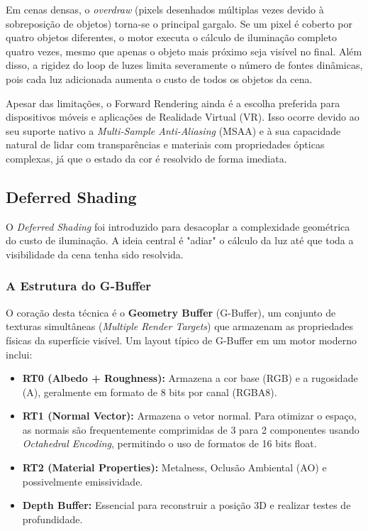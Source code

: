 Em cenas densas, o \textit{overdraw} (pixels desenhados múltiplas vezes devido à sobreposição de objetos) torna-se o principal gargalo. Se um pixel é coberto por quatro objetos diferentes, o motor executa o cálculo de iluminação completo quatro vezes, mesmo que apenas o objeto mais próximo seja visível no final. Além disso, a rigidez do loop de luzes limita severamente o número de fontes dinâmicas, pois cada luz adicionada aumenta o custo de todos os objetos da cena.

Apesar das limitações, o Forward Rendering ainda é a escolha preferida para dispositivos móveis e aplicações de Realidade Virtual (VR). Isso ocorre devido ao seu suporte nativo a \textit{Multi-Sample Anti-Aliasing} (MSAA) e à sua capacidade natural de lidar com transparências e materiais com propriedades ópticas complexas, já que o estado da cor é resolvido de forma imediata.

\subsection{Deferred Shading}

O \textit{Deferred Shading} foi introduzido para desacoplar a complexidade geométrica do custo de iluminação. A ideia central é "adiar" o cálculo da luz até que toda a visibilidade da cena tenha sido resolvida.

\subsubsection{A Estrutura do G-Buffer}

O coração desta técnica é o \textbf{Geometry Buffer} (G-Buffer), um conjunto de texturas simultâneas (\textit{Multiple Render Targets}) que armazenam as propriedades físicas da superfície visível. Um layout típico de G-Buffer em um motor moderno inclui:

\begin{itemize}
    \item \textbf{RT0 (Albedo + Roughness):} Armazena a cor base (RGB) e a rugosidade (A), geralmente em formato de 8 bits por canal (RGBA8).
    \item \textbf{RT1 (Normal Vector):} Armazena o vetor normal. Para otimizar o espaço, as normais são frequentemente comprimidas de 3 para 2 componentes usando \textit{Octahedral Encoding}, permitindo o uso de formatos de 16 bits float.
    \item \textbf{RT2 (Material Properties):} Metalness, Oclusão Ambiental (AO) e possivelmente emissividade.
    \item \textbf{Depth Buffer:} Essencial para reconstruir a posição 3D e realizar testes de profundidade.
\end{itemize}

